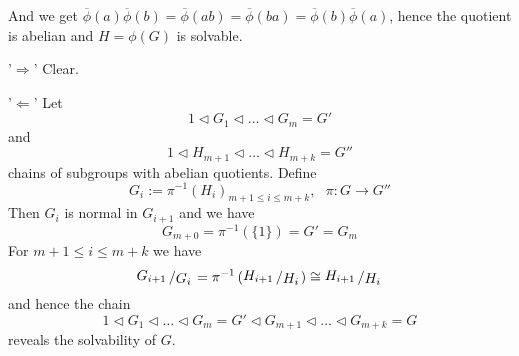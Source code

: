 \documentclass[12pt]{book}
\newcommand{\slant}[2]{{\raisebox{.1em}{$#1$}\left/\raisebox{-.1em}{$#2$}\right.}}
\begin{document}
\begin{spacing}{1.3}
\begin{compactenum}
\begin{compactenum}
And we get $\overline{\phi}(a) \overline{\phi}(b)=\overline{\phi}(ab)=\overline{\phi}(ba)=\overline{\phi}(b) \overline{\phi}(a)$, hence the quotient is abelian and $H=\phi(G)$ is solvable.
\end{compactenum}
\item \begin{compactitem}
\item['$\Rightarrow$'] Clear.
\item['$\Leftarrow$'] Let $$1 \triangleleft G_1 \triangleleft \dots \triangleleft G_m =G'$$ and $$1 \triangleleft H_{m+1} \triangleleft \dots \triangleleft H_{m+k}=G''$$ chains of subgroups with abelian quotients. Define $$G_i:= \pi^{-1} \left(H_i\right)_{m+1 \leqslant i \leqslant m+k}, \textrm{ } \pi:G \longrightarrow G''$$
Then $G_i$ is normal in $G_{i+1}$ and we have 
\noindent
$$G_{m+0}=\pi^{-1}(\{1\})=G'=G_m$$
\noindent
For $m+1 \leqslant i \leqslant m+k$ we have $$\slant{G_{i+1}}{G_i} = \pi^{-1}\left(\slant{H_{i+1}}{H_i}\right) \cong \slant{H_{i+1}}{H_i}$$ and hence the chain $$1 \triangleleft G_1 \triangleleft \dots \triangleleft G_m=G' \triangleleft G_{m+1} \triangleleft \dots \triangleleft G_{m+k}=G$$ reveals the solvability of $G$.
\end{compactitem}
\end{compactenum}


\end{spacing}
\end{document}
